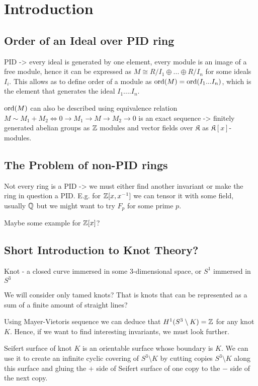 \section{Introduction}

\subsection{Order of an Ideal over PID ring}

PID -> every ideal is generated by one element, every module is an image of a free module, hence it can be expressed as $M\cong R/I_1\oplus...\oplus R/I_n$ for some ideals $I_i$. This allows as to define order of a module as $\operatorname{ord}(M)=\operatorname{ord}(I_1...I_n)$, which is the element that generates the ideal $I_1....I_n$. 

$\operatorname{ord}(M)$ can also be described using equivalence relation $M\sim M_1 + M_2\iff 0\to M_1\to M\to M_2\to 0$ is an exact sequence -> finitely generated abelian groups as $\operatorname{\mathbb{Z}}$ modules and vector fields over $\mathfrak{K}$ as $\mathfrak{K}[x]$-modules.

\subsection{The Problem of non-PID rings}

Not every ring is a PID -> we must either find another invariant or make the ring in question a PID. E.g. for $\operatorname{\mathbb{Z}}[x, x^{-1}]$ we can tensor it with some field, usually $\operatorname{\mathbb{Q}}$ but we might want to try $F_p$ for some prime $p$.

Maybe some example for $\operatorname{\mathbb{Z}}[x]$?

\subsection{Short Introduction to Knot Theory?}

Knot - a closed curve immersed in some $3$-dimensional space, or $S^1$ immersed in $S^3$

We will consider only tamed knots? That is knots that can be represented as a sum of a finite amount of straight lines?

Using Mayer-Vietoris sequence we can deduce that $H^1(S^3\setminus K)=\operatorname{\mathbb{Z}}$ for any knot $K$. Hence, if we want to find interesting invariants, we must look further. 

Seifert surface of knot $K$ is an orientable surface whose boundary is $K$. We can use it to create an infinite cyclic covering of $S^3\setminus K$ by cutting copies $S^3\setminus K$ along this surface and gluing the $+$ side of Seifert surface of one copy to the $-$ side of the next copy.

